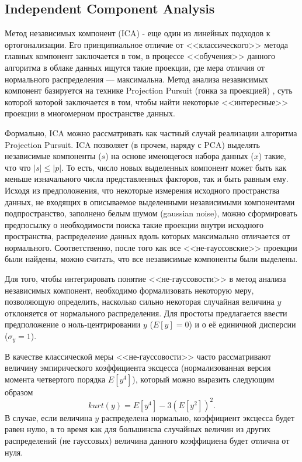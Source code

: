 \documentclass[runningheads]{llncs}
\begin{document}
\subsection{Independent Component Analysis}
\hspace{0.4cm}
Метод независимых компонент (ICA) - еще один из линейных подходов к ортогонализации. Его принципиальное отличие от <<классического>> метода главных компонент заключается в том, в процессе <<обучения>> данного алгоритма в облаке данных ищутся такие проекции, где мера отличия от нормального распределения — максимальна. Метод анализа независимых компонент базируется на технике Projection Pursuit (гонка за проекцией) \cite{projpurs}, суть которой которой заключается в том, чтобы найти некоторые <<интересные>> проекции в многомерном пространстве данных.\par Формально, ICA можно рассматривать как частный случай реализации алгоритма Projection Pursuit. ICA позволяет (в прочем, наряду с PCA) выделять независимые компоненты ($s$) на основе имеющегося набора данных ($x$) такие, что что $|s| \leq |p|$. То есть, число новых выделенных компонент может быть как меньше изначального числа представленных факторов, так и быть равным ему. Исходя из предположения, что некоторые измерения исходного пространства данных, не входящих в описываемое выделенными независимыми компонентами подпространство, заполнено белым шумом (gaussian noise), можно сформировать предпосылку о необходимости поиска такие проекции внутри исходного пространства, распределение данных вдоль которых максимально отличается от нормального. Соответственно, после того как все <<не-гауссовские>> проекции были найдены, можно считать, что все независимые компоненты были выделены. \par
Для того, чтобы интегрировать понятие <<не-гауссовости>> в метод анализа независимых компонент, необходимо формализовать некоторую меру, позволяющую определить, насколько сильно некоторая случайная величина $y$ отклоняется от нормального распределения. Для простоты предлагается ввести предположение о ноль-центрировании $y$ ($E[y] = 0$) и о её единичной дисперсии ($\sigma_y = 1$).\par
В качестве классической меры <<не-гауссовости>> часто рассматривают величину эмпирического коэффициента эксцесса (нормализованная версия момента четвертого порядка $E[y^4]$), который можно выразить следующим образом $$kurt(y) = E[y^4] - 3(E[y^2])^2.$$
В случае, если величина $y$ распределена нормально, коэффициент эксцесса будет равен нулю, в то время как для большинсва случайных величин из других распределений (не гауссовых) величина данного коэффициена будет отлична от нуля.\par
\end{document}
